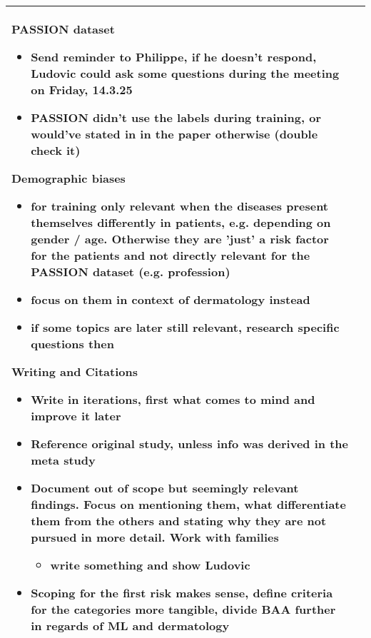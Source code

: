 \documentclass[a4paper,11pt]{article}
\begin{document}
\begin{longtable}{|p{3.5cm}|p{12cm}|}
		PASSION dataset
		\begin{itemize}
			\item Send reminder to Philippe, if he doesn't respond, Ludovic could ask some questions during the meeting on Friday, 14.3.25
			\item PASSION didn't use the labels during training, or would've stated in in the paper otherwise (double check it)
		\end{itemize}
		
		Demographic biases
		\begin{itemize}
			\item for training only relevant when the diseases present themselves differently in patients, e.g. depending on gender / age. Otherwise they are 'just' a risk factor for the patients and not directly relevant for the PASSION dataset (e.g. profession)
			\item focus on them in context of dermatology instead
			\item if some topics are later still relevant, research specific questions then
		\end{itemize}
		
		Writing and Citations
		\begin{itemize}
			\item Write in iterations, first what comes to mind and improve it later
			\item Reference original study, unless info was derived in the meta study
			\item Document out of scope but seemingly relevant findings. Focus on mentioning them, what differentiate them from the others and stating why they are not pursued in more detail. Work with families
			\begin{itemize}
				\item write something and show Ludovic
			\end{itemize}
			\item Scoping for the first risk makes sense, define criteria for the categories more tangible, divide BAA further in regards of ML and dermatology
			
		\end{itemize} \\
		\hline
	\end{longtable}
	
\end{document}
